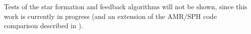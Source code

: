 Tests of the star formation and
feedback algorithms will not be shown, since this work is currently in
progress (and an extension of the AMR/SPH code comparison described in
\citet{2005ApJS..160....1O}).
%



